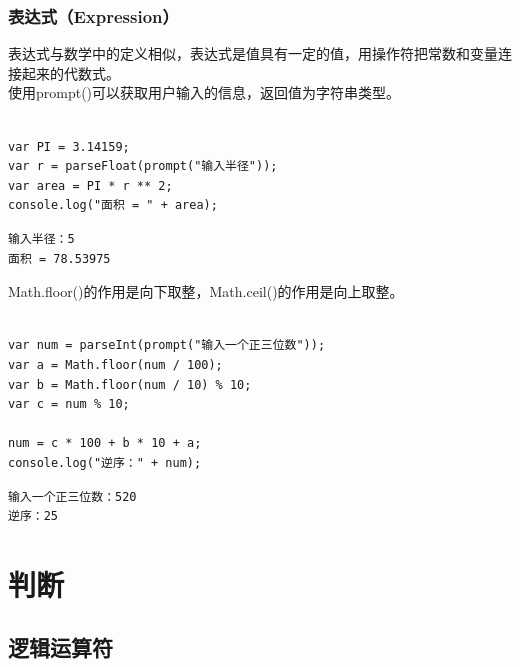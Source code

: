\vspace{0.5cm}

\subsection{表达式（Expression）}

表达式与数学中的定义相似，表达式是值具有一定的值，用操作符把常数和变量连接起来的代数式。\\

使用prompt()可以获取用户输入的信息，返回值为字符串类型。\\

\\

\begin{lstlisting}[style=htmlcssjs]
var PI = 3.14159;
var r = parseFloat(prompt("输入半径"));
var area = PI * r ** 2;
console.log("面积 = " + area);
\end{lstlisting}

\begin{tcolorbox}
	\begin{verbatim}
输入半径：5
面积 = 78.53975
	\end{verbatim}
\end{tcolorbox}

Math.floor()的作用是向下取整，Math.ceil()的作用是向上取整。\\

\\

\begin{lstlisting}[style=htmlcssjs]
var num = parseInt(prompt("输入一个正三位数"));
var a = Math.floor(num / 100);
var b = Math.floor(num / 10) % 10;
var c = num % 10;

num = c * 100 + b * 10 + a;
console.log("逆序：" + num);
\end{lstlisting}

\begin{tcolorbox}
	\begin{verbatim}
输入一个正三位数：520
逆序：25
	\end{verbatim}
\end{tcolorbox}

\newpage

\chapter{判断}

\section{逻辑运算符}

